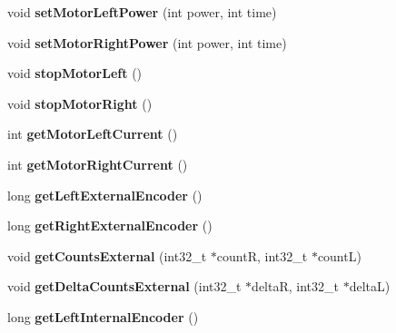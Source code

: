 \begin{DoxyCompactItemize}
\mbox{\label{classAsservN_a58b06f1946e8fef92d1f6dac6e6b6812}} 
void {\bfseries set\+Motor\+Left\+Power} (int power, int time)
\item 
\mbox{\label{classAsservN_a6cd6dea6f8d3d7327000cafa4e146a79}} 
void {\bfseries set\+Motor\+Right\+Power} (int power, int time)
\item 
\mbox{\label{classAsservN_ab2151d7dbb394e7b601ba5e6c097673e}} 
void {\bfseries stop\+Motor\+Left} ()
\item 
\mbox{\label{classAsservN_a2c857e3229767323dcd203d65963a4f7}} 
void {\bfseries stop\+Motor\+Right} ()
\item 
\mbox{\label{classAsservN_a059867ab5426b4309b1673c9252d207d}} 
int {\bfseries get\+Motor\+Left\+Current} ()
\item 
\mbox{\label{classAsservN_a58eb2d1d64a6798440bcf1e557ec2a57}} 
int {\bfseries get\+Motor\+Right\+Current} ()
\item 
\mbox{\label{classAsservN_a89a94c0eff3b0b84cd58c2f8444cbe16}} 
long {\bfseries get\+Left\+External\+Encoder} ()
\item 
\mbox{\label{classAsservN_aa629c55c665e057e06eb7aa655ae4d7f}} 
long {\bfseries get\+Right\+External\+Encoder} ()
\item 
\mbox{\label{classAsservN_a07cfcf79b3a0c82c3bf7183b724e7b19}} 
void {\bfseries get\+Counts\+External} (int32\+\_\+t $\ast$countR, int32\+\_\+t $\ast$countL)
\item 
\mbox{\label{classAsservN_a1faa9318339e6e8ca5d699c6a9a718e0}} 
void {\bfseries get\+Delta\+Counts\+External} (int32\+\_\+t $\ast$deltaR, int32\+\_\+t $\ast$deltaL)
\item 
\mbox{\label{classAsservN_a446c346c518d4599d75ee9c14e6aa16a}} 
long {\bfseries get\+Left\+Internal\+Encoder} ()
\item 
\mbox{\label{classAsservN_a0d3689c8143b2d0b3eded0280d6a0546}} 

\end{DoxyCompactItemize}
